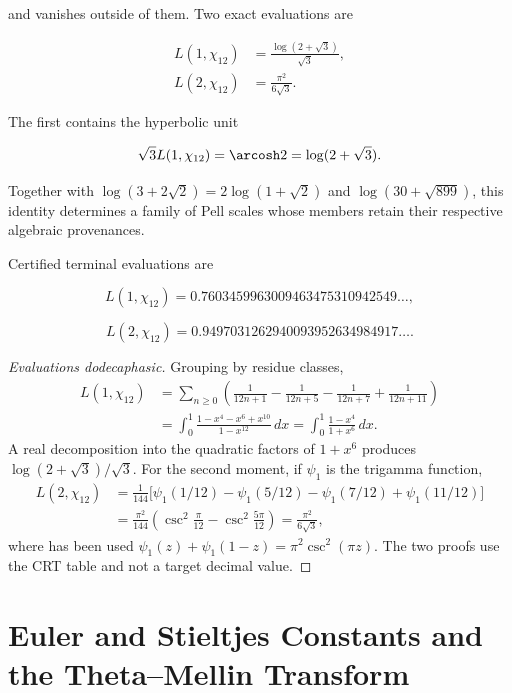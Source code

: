 and vanishes outside of them. Two exact evaluations are

\begin{align}
L(1,\chi_{12})&=\frac{\log(2+\sqrt3)}{\sqrt3},
\label{eq:L1chi12}\\
L(2,\chi_{12})&=\frac{\pi^2}{6\sqrt3}.
\label{eq:L2chi12}
\end{align}

The first contains the hyperbolic unit

\begin{equation}
\sqrt3L(1,\chi_{12})=\arcosh2=\log(2+\sqrt3).
\label{eq:pell2}
\end{equation}

Together with \(\log(3+2\sqrt2)=2\log(1+\sqrt2)\) and \(\log(30+\sqrt{899})\), this identity determines a
family of Pell scales whose members retain their respective algebraic
provenances.

Certified terminal evaluations are

\[
L(1,\chi_{12})=0.7603459963009463475310942549\ldots,
\]

\[
L(2,\chi_{12})=0.9497031262940093952634984917\ldots.
\]

\begin{proof}[Evaluations dodecaphasic]
Grouping by residue classes,
\begin{align*}
L(1,\chi_{12})
&=\sum_{n\ge0}\left(
\frac1{12n+1}-\frac1{12n+5}
-\frac1{12n+7}+\frac1{12n+11}\right)\\
&=\int_0^1
\frac{1-x^4-x^6+x^{10}}{1-x^{12}}\,dx
=\int_0^1\frac{1-x^4}{1+x^6}\,dx.
\end{align*}
A real decomposition into the quadratic factors of \(1+x^6\)
produces
\(\log(2+\sqrt3)/\sqrt3\). For the second moment, if
\(\psi_1\) is the trigamma function,
\begin{align*}
L(2,\chi_{12})
&=\frac1{144}\bigl[
\psi_1(1/12)-\psi_1(5/12)
-\psi_1(7/12)+\psi_1(11/12)\bigr]\\
&=\frac{\pi^2}{144}\left(
\csc^2\frac\pi{12}-\csc^2\frac{5\pi}{12}\right)
=\frac{\pi^2}{6\sqrt3},
\end{align*}
where has been used
\(\psi_1(z)+\psi_1(1-z)=\pi^2\csc^2(\pi z)\). The two proofs use
the CRT table and not a target decimal value.
\end{proof}

\section{Euler and Stieltjes Constants and the Theta--Mellin Transform}

